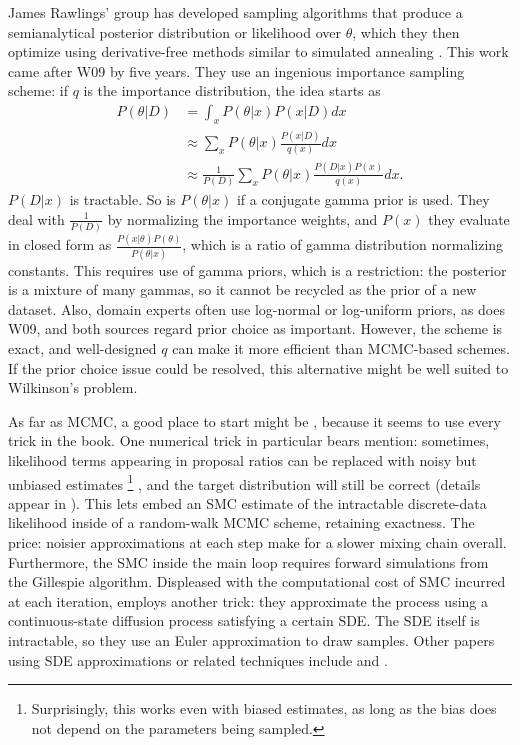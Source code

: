 \documentclass{article}
\begin{document}
James Rawlings' group has developed sampling algorithms that produce a semianalytical posterior distribution or likelihood over $\theta$, which they then optimize using derivative-free methods similar to simulated annealing \cite{gupta2014comparison,srivastava_rawlings2014stoch_opt}.   This work came after W09 by five years. They use an ingenious importance sampling scheme: if $q$ is the importance distribution, the idea starts as
\begin{align*}
P(\theta|D) &= \int_x P(\theta|x)P(x|D) dx\\
&\approx \sum_x P(\theta|x)\frac{P(x|D)}{q(x)} dx\\
&\approx \frac{1}{P(D)}\sum_x P(\theta|x)\frac{P(D|x)P(x)}{q(x)} dx.
\end{align*}
$P(D|x)$ is tractable. So is $P(\theta|x)$ if a conjugate gamma prior is used. They deal with $\frac{1}{P(D)}$ by normalizing the importance weights, and $P(x)$ they evaluate in closed form as $\frac{P(x|\theta)P(\theta)}{P(\theta|x)}$, which is a ratio of gamma distribution normalizing constants. This requires use of gamma priors, which is a restriction: the posterior is a mixture of many gammas, so it cannot be recycled as the prior of a new dataset. Also, domain experts 
often use log-normal or log-uniform priors, as does W09, and both sources regard prior choice as important. However, the scheme is exact, and well-designed $q$ can make it more efficient than MCMC-based schemes. If the prior choice issue could be resolved, this alternative might be well suited to Wilkinson's problem. 

As far as MCMC, a good place to start might be \cite{golightly2011bayesian}, because it seems to use every trick in the book. One numerical trick in particular bears mention: sometimes, likelihood terms appearing in proposal ratios can be replaced with noisy but unbiased estimates 
%
\footnote{Surprisingly, this works even with biased estimates, as long as the bias does not depend on the parameters being sampled.}
%
, and the target distribution will still be correct (details appear in \cite{andrieu2010particle}). This lets \cite{golightly2011bayesian} embed an SMC estimate of the intractable discrete-data likelihood inside of a random-walk MCMC scheme, retaining exactness. The price: noisier approximations at each step make for a slower mixing chain overall. Furthermore, the SMC inside the main loop requires forward simulations from the Gillespie algorithm. Displeased with the computational cost of SMC incurred at each iteration, \cite{golightly2011bayesian} employs another trick: they approximate the process using a continuous-state diffusion process satisfying a certain SDE. The SDE itself is intractable, so they use an Euler approximation to draw samples. Other papers using SDE approximations or related techniques include \cite{golightly2005bayesian} and
 \cite{fearnhead2014inference}.
\end{document}
